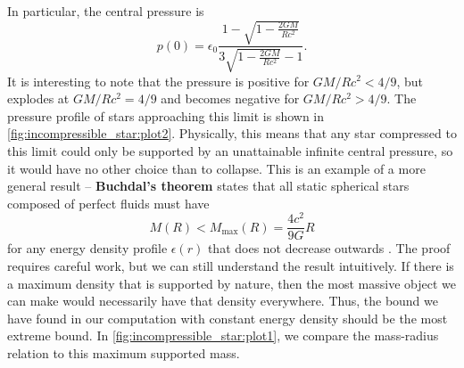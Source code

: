In particular, the central pressure is
\begin{equation}
	p(0) = \epsilon_0 \frac{1 - \sqrt{1 - \frac{2GM}{Rc^2}}}{3 \sqrt{1-\frac{2GM}{Rc^2}} - 1} .
	\label{eq:incompressible_star:central_pressure}
\end{equation}
It is interesting to note that the pressure is positive for $GM/Rc^2 < 4/9$, but explodes at $GM/Rc^2 = 4/9$ and becomes negative for $GM/Rc^2 > 4/9$.
The pressure profile of stars approaching this limit is shown in \cref{fig:incompressible_star:plot2}.
Physically, this means that any star compressed to this limit could only be supported by an unattainable infinite central pressure, so it would have no other choice than to collapse.
This is an example of a more general result -- \textbf{Buchdal's theorem} states that all static spherical stars composed of perfect fluids must have
\begin{equation}
	M(R) < M_\text{max}(R) = \frac{4c^2}{9G} R
	\label{eq:incompressible_star:buchdal}
\end{equation}
for any energy density profile $\epsilon(r)$ that does not decrease outwards \cite{ref:buchdal}.
The proof requires careful work, but we can still understand the result intuitively.
If there is a maximum density that is supported by nature, then the most massive object we can make would necessarily have that density everywhere.
Thus, the bound we have found in our computation with constant energy density should be the most extreme bound.
In \cref{fig:incompressible_star:plot1}, we compare the mass-radius relation to this maximum supported mass.

